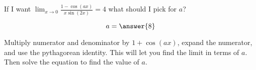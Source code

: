 \documentclass{ximera}
\author{Steven Gubkin}
\begin{document}
\begin{exercise}

If I want $\lim_{x \to 0} \frac{1-\cos(ax)}{x\sin(2x)} = 4$ what should I pick for $a$?
	
	\[a = \answer{8}\]
	
	\begin{hint}
		Multiply numerator and denominator by $1+\cos(ax)$, expand the numerator, and use the pythagorean identity.  This will let you find the limit in terms of $a$.  Then solve the equation to find the value of $a$.
	\end{hint}

\end{exercise}
\end{document}

